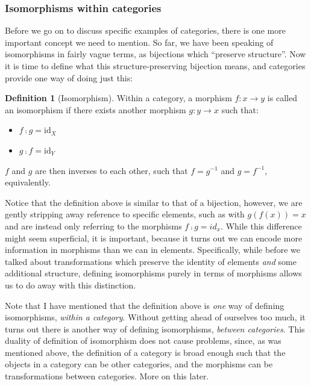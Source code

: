 \documentclass[
]{book}
\providecommand{\tightlist}{%
  \setlength{\itemsep}{0pt}\setlength{\parskip}{0pt}}
\theoremstyle{definition}
\newtheorem{definition}{Definition}[chapter]
\theoremstyle{definition}
\theoremstyle{definition}
\theoremstyle{definition}
\theoremstyle{remark}
\begin{document}
\subsubsection{Isomorphisms within categories}\label{isomorphism}

Before we go on to discuss specific examples of categories, there is one more important concept we need to mention. So far, we have been speaking of isomorphisms in fairly vague terms, as bijections which ``preserve structure''. Now it is time to define what this structure-preserving bijection means, and categories provide one way of doing just this:

\begin{definition}[Isomorphism]
Within a category, a morphism \(f: x \to y\) is called an isomorphism if there exists another morphism \(g: y \to x\) such that:

\begin{itemize}
\tightlist
\item
  \(f ⨾g = \text{id}_X\)
\item
  \(g ⨾f = \text{id}_Y\)
\end{itemize}

\(f\) and \(g\) are then inverses to each other, such that \(f = g^{-1}\) and \(g = f^{-1}\), equivalently.
\end{definition}

Notice that the definition above is similar to that of a bijection, however, we are gently stripping away reference to specific elements, such as with \(g(f(x)) = x\) and are instead only referring to the morphisms \(f ⨾g = id_{x}\). While this difference might seem superficial, it is important, because it turns out we can encode more information in morphisms than we can in elements. Specifically, while before we talked about transformations which preserve the identity of elements \emph{and} some additional structure, defining isomorphisms purely in terms of morphisms allows us to do away with this distinction.

Note that I have mentioned that the definition above is \emph{one} way of defining isomorphisms, \emph{within a category}. Without getting ahead of ourselves too much, it turns out there is another way of defining isomorphisms, \emph{between categories}. This duality of definition of isomorphism does not cause problems, since, as was mentioned above, the definition of a category is broad enough such that the objects in a category can be other categories, and the morphisms can be transformations between categories. More on this later.
\end{document}
